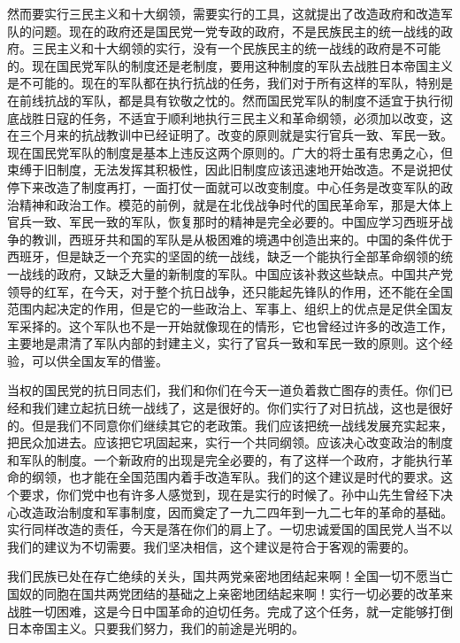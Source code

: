 然而要实行三民主义和十大纲领，需要实行的工具，这就提出了改造政府和改造军队的问题。现在的政府还是国民党一党专政的政府，不是民族民主的统一战线的政府。三民主义和十大纲领的实行，没有一个民族民主的统一战线的政府是不可能的。现在国民党军队的制度还是老制度，要用这种制度的军队去战胜日本帝国主义是不可能的。现在的军队都在执行抗战的任务，我们对于所有这样的军队，特别是在前线抗战的军队，都是具有钦敬之忱的。然而国民党军队的制度不适宜于执行彻底战胜日寇的任务，不适宜于顺利地执行三民主义和革命纲领，必须加以改变，这在三个月来的抗战教训中已经证明了。改变的原则就是实行官兵一致、军民一致。现在国民党军队的制度是基本上违反这两个原则的。广大的将士虽有忠勇之心，但束缚于旧制度，无法发挥其积极性，因此旧制度应该迅速地开始改造。不是说把仗停下来改造了制度再打，一面打仗一面就可以改变制度。中心任务是改变军队的政治精神和政治工作。模范的前例，就是在北伐战争时代的国民革命军，那是大体上官兵一致、军民一致的军队，恢复那时的精神是完全必要的。中国应学习西班牙战争的教训，西班牙共和国的军队是从极困难的境遇中创造出来的。中国的条件优于西班牙，但是缺乏一个充实的坚固的统一战线，缺乏一个能执行全部革命纲领的统一战线的政府，又缺乏大量的新制度的军队。中国应该补救这些缺点。中国共产党领导的红军，在今天，对于整个抗日战争，还只能起先锋队的作用，还不能在全国范围内起决定的作用，但是它的一些政治上、军事上、组织上的优点是足供全国友军采择的。这个军队也不是一开始就像现在的情形，它也曾经过许多的改造工作，主要地是肃清了军队内部的封建主义，实行了官兵一致和军民一致的原则。这个经验，可以供全国友军的借鉴。

当权的国民党的抗日同志们，我们和你们在今天一道负着救亡图存的责任。你们已经和我们建立起抗日统一战线了，这是很好的。你们实行了对日抗战，这也是很好的。但是我们不同意你们继续其它的老政策。我们应该把统一战线发展充实起来，把民众加进去。应该把它巩固起来，实行一个共同纲领。应该决心改变政治的制度和军队的制度。一个新政府的出现是完全必要的，有了这样一个政府，才能执行革命的纲领，也才能在全国范围内着手改造军队。我们的这个建议是时代的要求。这个要求，你们党中也有许多人感觉到，现在是实行的时候了。孙中山先生曾经下决心改造政治制度和军事制度，因而奠定了一九二四年到一九二七年的革命的基础。实行同样改造的责任，今天是落在你们的肩上了。一切忠诚爱国的国民党人当不以我们的建议为不切需要。我们坚决相信，这个建议是符合于客观的需要的。

我们民族已处在存亡绝续的关头，国共两党亲密地团结起来啊！全国一切不愿当亡国奴的同胞在国共两党团结的基础之上亲密地团结起来啊！实行一切必要的改革来战胜一切困难，这是今日中国革命的迫切任务。完成了这个任务，就一定能够打倒日本帝国主义。只要我们努力，我们的前途是光明的。


